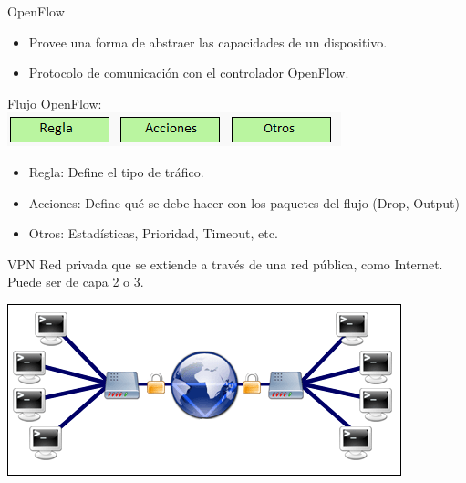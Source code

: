 \documentclass[xcolor=svgnames]{beamer}
\begin{document}
\begin{frame}{OpenFlow}
	\begin{itemize}
		\item Provee una forma de abstraer las capacidades de un dispositivo.
		\item Protocolo de comunicación con el controlador OpenFlow.
	\end{itemize}
	\pause
	\vspace{4mm}
	\begin{center}
		Flujo OpenFlow: \\
		\includegraphics[scale=0.55]{flujo_openflow}
	\end{center}
	\begin{itemize}
		\item Regla: Define el tipo de tráfico.
		\item Acciones: Define qué se debe hacer con los paquetes del flujo (Drop, Output)
		\item Otros: Estadísticas, Prioridad, Timeout, etc.
	\end{itemize}
\end{frame}

\begin{frame}{VPN}
	Red privada que se extiende a través de una red pública, como Internet. Puede ser de capa 2 o 3.
	\begin{center}
		\includegraphics[scale=0.8]{vpn}
	\end{center}
\end{frame}
\end{document}
